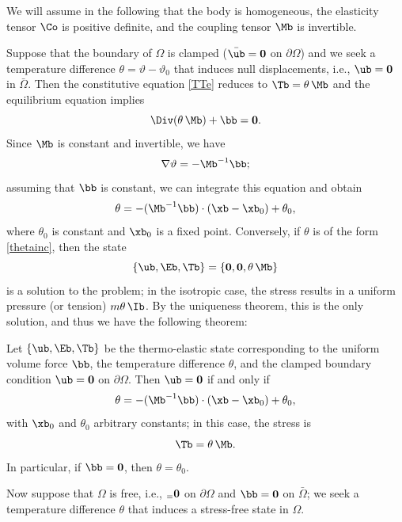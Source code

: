 We will assume in the following that the body is homogeneous, the elasticity tensor $\Co$ is positive definite, and the coupling tensor $\Mb$ is invertible.

Suppose that the boundary of $\Omega$ is clamped ($\bar{\ub}=\mathbf{0}$ on $\partial\Omega$) and we seek a temperature difference $\theta=\vartheta-\vartheta_0$ that induces null displacements, i.e., $\ub=\mathbf{0}$ in $\bar{\Omega}$. Then the constitutive equation \eqref{TTe} reduces to $\Tb=\theta\, \Mb$ and the equilibrium equation implies
\begin{equation}
	\Div(\theta\,\Mb)+\bb=\mathbf{0}.
\end{equation}
Since $\Mb$ is constant and invertible, we have
\begin{equation}
	\nabla\vartheta=-\Mb^{-1}\bb;
\end{equation}
assuming that $\bb$ is constant, we can integrate this equation and obtain
\begin{equation}\label{thetainc}
	\theta=-(\Mb^{-1}\bb)\cdot (\xb-\xb_0)+\theta_0,
\end{equation}
where $\theta_0$ is constant and $\xb_0$ is a fixed point. Conversely, if $\theta$ is of the form \eqref{thetainc}, then the state
\begin{equation}
	\{ \ub, \Eb, \Tb\}=\{\mathbf{0}, \mathbf{0}, \theta\,\Mb\}
\end{equation}
is a solution to the problem; in the isotropic case, the stress results in a uniform pressure (or tension) $m\theta\,\Ib$. By the uniqueness theorem, this is the only solution, and thus we have the following theorem:
\begin{definition}
	Let $\{ \ub, \Eb, \Tb\}$ be the thermo-elastic state corresponding to the uniform volume force $\bb$, the temperature difference $\theta$, and the clamped boundary condition $\ub=\mathbf{0}$ on $\partial\Omega$. Then $\ub=\mathbf{0}$ if and only if
	\begin{equation}
		\theta=-(\Mb^{-1}\bb)\cdot (\xb-\xb_0)+\theta_0,
	\end{equation}
	with $\xb_0$ and $\theta_0$ arbitrary constants; in this case, the stress is
	\begin{equation}
		\Tb=\theta\,\Mb.
	\end{equation}
	In particular, if $\bb=\mathbf{0}$, then $\theta=\theta_0$.
\end{definition}

Now suppose that $\Omega$ is free, i.e., $\sb =\mathbf{0}$ on $\partial{\Omega}$ and $\bb=\mathbf{0}$ on $\bar{\Omega}$; we seek a temperature difference $\theta$ that induces a stress-free state in $\Omega$.

